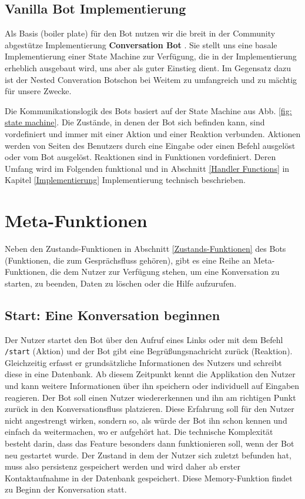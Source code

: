         \subsection{Vanilla Bot Implementierung}
            Als Basis (boiler plate) für den Bot nutzen wir die breit in der Community abgestütze Implementierung \textbf{Conversation Bot} \cite{conversationBot}. Sie stellt uns eine basale Implementierung einer State Machine zur Verfügung, die in der Implementierung erheblich ausgebaut wird, uns aber als guter Einstieg dient. Im Gegensatz dazu ist der \glqq Nested Converation Bot\grqq schon bei Weitem zu umfangreich und zu mächtig für unsere Zwecke.

    Die Kommunikationslogik des Bots basiert auf der State Machine aus Abb. \ref*{fig: state machine}. Die Zustände, in denen der Bot sich befinden kann, sind vordefiniert und immer mit einer Aktion und einer Reaktion verbunden. Aktionen werden von Seiten des Benutzers durch eine Eingabe oder einen Befehl ausgelöst oder vom Bot ausgelöst. Reaktionen sind in Funktionen vordefiniert. Deren Umfang wird im Folgenden funktional und in Abschnitt \ref*{Handler Functions} in Kapitel \ref{Implementierung} Implementierung technisch beschrieben.

    
    \section{Meta-Funktionen}
        Neben den Zustands-Funktionen in Abschnitt \ref*{Zustands-Funktionen} des Bots (Funktionen, die zum Gesprächsfluss gehören), gibt es eine Reihe an Meta-Funktionen, die dem Nutzer zur Verfügung stehen, um eine Konversation zu starten, zu beenden, Daten zu löschen oder die Hilfe aufzurufen.

        \subsection{Start: Eine Konversation beginnen}
            Der Nutzer startet den Bot über den Aufruf eines Links oder mit dem Befehl \verb|/start| (Aktion) und der Bot gibt eine Begrüßungsnachricht zurück (Reaktion). Gleichzeitig erfasst er grundsätzliche Informationen des Nutzers und schreibt diese in eine Datenbank. Ab diesem Zeitpunkt kennt die Applikation den Nutzer und kann weitere Informationen über ihn speichern oder individuell auf Eingaben reagieren. Der Bot soll einen Nutzer wiedererkennen und ihn am richtigen Punkt zurück in den Konversationsfluss platzieren. Diese Erfahrung soll für den Nutzer nicht angestrengt wirken, sondern so, als würde der Bot ihn schon kennen und einfach da weitermachen, wo er aufgehört hat. Die technische Komplexität besteht darin, dass das Feature besonders dann funktionieren soll, wenn der Bot neu gestartet wurde. Der Zustand in dem der Nutzer sich zuletzt befunden hat, muss also persistenz gespeichert werden und wird daher ab erster Kontaktaufnahme in der Datenbank gespeichert. Diese Memory-Funktion findet zu Beginn der Konversation statt.

